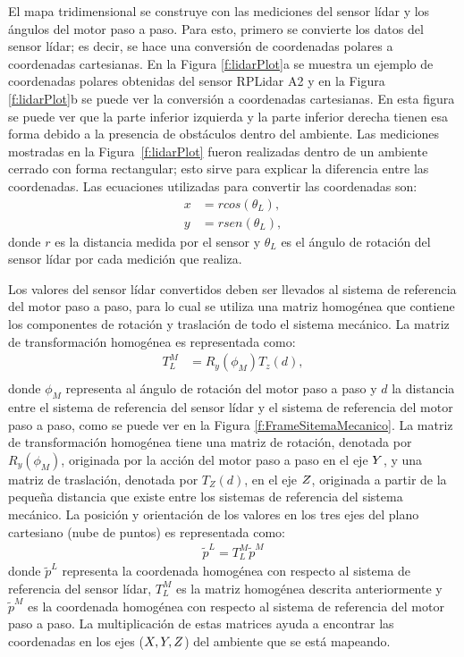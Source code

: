El mapa tridimensional se construye con las mediciones del sensor lídar y los ángulos del motor 
paso a paso. Para esto, primero se convierte los datos del sensor lídar; es decir, se hace una 
conversión de coordenadas polares a coordenadas cartesianas. En la Figura \ref{f:lidarPlot}a 
se muestra un ejemplo de coordenadas polares obtenidas del sensor RPLidar A2 y en la Figura 
\ref{f:lidarPlot}b se puede ver la conversión a coordenadas cartesianas. En esta figura se 
puede ver que la parte inferior izquierda y la parte inferior derecha tienen esa forma 
debido a la presencia de obstáculos dentro del ambiente. Las mediciones 
mostradas en la Figura~\ref{f:lidarPlot} fueron realizadas dentro de un ambiente cerrado con 
forma rectangular; esto sirve para explicar la diferencia entre las coordenadas. Las ecuaciones 
utilizadas para convertir las coordenadas son:
\begin{align*}
	x &= rcos(\theta_{L}), \\
	y &= rsen(\theta_{L}),
\end{align*}
donde $r$ es la distancia medida por el sensor y $\theta_{L}$ es el ángulo de rotación 
del sensor lídar por cada medición que realiza.

Los valores del sensor lídar convertidos deben ser llevados al sistema de referencia del 
motor paso a paso, para lo cual se utiliza una matriz homogénea que contiene los 
componentes de rotación y traslación de todo el sistema mecánico. La matriz de 
transformación homogénea es representada como:
\begin{align*}
	T_{L}^{M} &= R_{y}(\phi_{M}) T_{z}(d), \\
\end{align*}
donde $\phi_{M}$ representa al ángulo de rotación del motor paso a paso y $d$  la distancia entre el 
sistema de referencia del sensor lídar y el sistema de referencia del motor paso a paso, como se 
puede ver en la Figura \ref{f:FrameSitemaMecanico}. La matriz  de transformación homogénea
tiene una matriz de rotación, denotada por $R_{y}(\phi_{M})$, originada por la acción del 
motor paso a paso en el eje $\mathnormal Y$, y una matriz de traslación, denotada por $T_{Z}(d)$, en el 
eje $\mathnormal Z$, originada a partir de la pequeña distancia que existe entre los sistemas de referencia 
del sistema mecánico. La posición y orientación de los valores en los tres ejes del plano
cartesiano (nube de puntos) es representada como:
\begin{align}
	\tilde{p}^{L} = T_{L}^{M} \tilde{p}^{M}
	\label{eqn:MatrizHomogenea}
\end{align}
donde $\tilde{p}^{L}$ representa la coordenada homogénea con respecto al sistema de referencia del sensor
lídar, $T_{L}^{M}$ es la matriz homogénea descrita anteriormente y $\tilde{p}^{M}$ es la coordenada 
homogénea con respecto al sistema de referencia del motor paso a paso. La multiplicación de estas matrices
ayuda a encontrar las coordenadas en los ejes ($\mathnormal X,\mathnormal Y,\mathnormal Z$) del ambiente
que se está mapeando.

